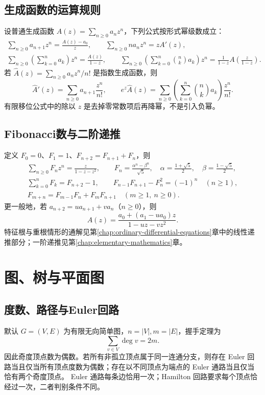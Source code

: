 \documentclass[../main.tex]{subfiles}
\begin{document}
\subsection{生成函数的运算规则}
设普通生成函数 $A(z)=\sum_{n\ge0}a_nz^n$，下列公式按形式幂级数成立：
\begin{gather*}
\sum_{n\ge0}a_{n+1}z^n=\frac{A(z)-a_0}{z},\qquad
\sum_{n\ge0}na_nz^n=zA'(z),\\
\sum_{n\ge0}\left(\sum_{k=0}^na_k\right)z^n=\frac{A(z)}{1-z},\qquad
\sum_{n\ge0}\left(\sum_{k=0}^n\binom nk a_k\right)z^n
=\frac1{1-z}A\!\left(\frac z{1-z}\right).
\end{gather*}
若 $\widehat A(z)=\sum_{n\ge0}a_nz^n/n!$ 是指数生成函数，则
\[
\widehat A'(z)=\sum_{n\ge0}a_{n+1}\frac{z^n}{n!},\qquad
e^z\widehat A(z)=\sum_{n\ge0}\left(\sum_{k=0}^n\binom nk a_k\right)\frac{z^n}{n!}.
\]
有限移位公式中的除以 $z$ 是去掉零常数项后再降幂，不是引入负幂。

\subsection{Fibonacci数与二阶递推}
定义 $F_0=0$、$F_1=1$、$F_{n+2}=F_{n+1}+F_n$，则
\begin{gather*}
\sum_{n\ge0}F_nz^n=\frac z{1-z-z^2},\qquad
F_n=\frac{\alpha^n-\beta^n}{\sqrt5},\quad
\alpha=\frac{1+\sqrt5}{2},\quad\beta=\frac{1-\sqrt5}{2},\\
\sum_{k=0}^nF_k=F_{n+2}-1,\qquad
F_{n-1}F_{n+1}-F_n^2=(-1)^n\quad(n\ge1),\\
F_{m+n}=F_{m-1}F_n+F_mF_{n+1}\quad(m\ge1,\ n\ge0).
\end{gather*}
更一般地，若 $a_{n+2}=u a_{n+1}+v a_n$（$n\ge0$），则
\[
A(z)=\frac{a_0+(a_1-u a_0)z}{1-uz-vz^2}.
\]
特征根与重根情形的通解见第\ref{chap:ordinary-differential-equations}章中的线性递推部分；一阶递推见第\ref{chap:elementary-mathematics}章。

\section{图、树与平面图}
\subsection{度数、路径与Euler回路}
默认 $G=(V,E)$ 为有限无向简单图，$n=|V|,m=|E|$，握手定理为
\[
\sum_{v\in V}\deg v=2m.
\]
因此奇度顶点数为偶数。若所有非孤立顶点属于同一连通分支，则存在 Euler 回路当且仅当所有顶点度数为偶数；存在以不同顶点为端点的 Euler 通路当且仅当恰有两个奇度顶点。
Euler 通路每条边恰用一次；Hamilton 回路要求每个顶点恰经过一次，二者判别条件不同。
\end{document}
